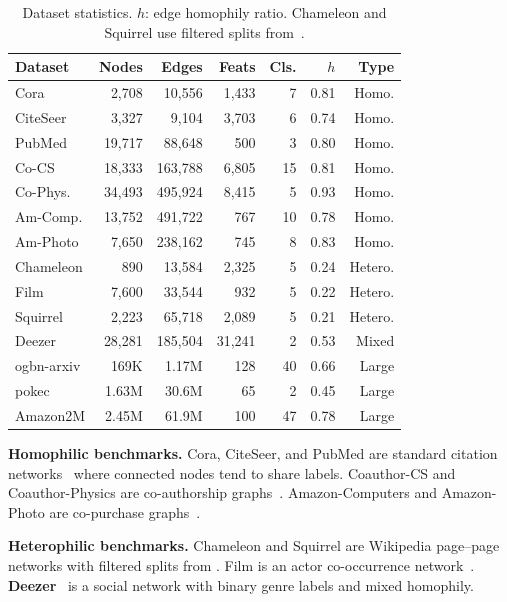 \documentclass[manuscript, screen, review, anonymous]{acmart}
\begin{document}
\begin{table}[t]
\caption{Dataset statistics. $h$: edge homophily ratio. Chameleon and Squirrel use filtered splits from~\citet{platonov2023critical}.}
\label{tab:datasets}
\centering
\small
\begin{tabular}{lrrrrrr}
\toprule
\textbf{Dataset} & \textbf{Nodes} & \textbf{Edges} & \textbf{Feats} & \textbf{Cls.} & \textbf{$h$} & \textbf{Type} \\
\midrule
Cora       & 2,708  & 10,556  & 1,433  & 7  & 0.81 & Homo. \\
CiteSeer   & 3,327  & 9,104   & 3,703  & 6  & 0.74 & Homo. \\
PubMed     & 19,717 & 88,648  & 500    & 3  & 0.80 & Homo. \\
Co-CS      & 18,333 & 163,788 & 6,805  & 15 & 0.81 & Homo. \\
Co-Phys.   & 34,493 & 495,924 & 8,415  & 5  & 0.93 & Homo. \\
Am-Comp.   & 13,752 & 491,722 & 767    & 10 & 0.78 & Homo. \\
Am-Photo   & 7,650  & 238,162 & 745    & 8  & 0.83 & Homo. \\
Chameleon  & 890    & 13,584  & 2,325  & 5  & 0.24 & Hetero. \\
Film       & 7,600  & 33,544  & 932    & 5  & 0.22 & Hetero. \\
Squirrel   & 2,223  & 65,718  & 2,089  & 5  & 0.21 & Hetero. \\
Deezer     & 28,281 & 185,504 & 31,241 & 2  & 0.53 & Mixed \\
\midrule
ogbn-arxiv & 169K   & 1.17M   & 128    & 40 & 0.66 & Large \\
pokec      & 1.63M  & 30.6M   & 65     & 2  & 0.45 & Large \\
Amazon2M   & 2.45M  & 61.9M   & 100    & 47 & 0.78 & Large \\
\bottomrule
\end{tabular}
\end{table}

\noindent\textbf{Homophilic benchmarks.} Cora, CiteSeer, and PubMed are standard citation networks~\cite{kipf2017semi, sen2008collective} where connected nodes tend to share labels. Coauthor-CS and Coauthor-Physics are co-authorship graphs~\cite{shchur2018pitfalls}. Amazon-Computers and Amazon-Photo are co-purchase graphs~\cite{shchur2018pitfalls}.

\noindent\textbf{Heterophilic benchmarks.} Chameleon and Squirrel are Wikipedia page--page networks with filtered splits from \citet{platonov2023critical}. Film is an actor co-occurrence network~\cite{pei2020geomgcn}. \textbf{Deezer}~\cite{rozemberczki2021deezer} is a social network with binary genre labels and mixed homophily.
\end{document}
